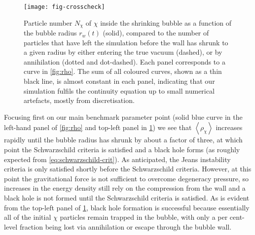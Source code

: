 \documentclass[
onecolumn, %
11pt, %
tightenlines,
superscriptaddress, %
nofootinbib, %
preprintnumbers, %
prd %
]{revtex4-1}
\newcommand{\ev}[1]{\ensuremath{\left\langle #1 %
        \right\rangle}} %
\begin{document}
\begin{figure}
    \centering
    \texttt{[image: fig-crosscheck]}
    \caption{
        Particle number $N_\chi$ of $\chi$ inside the shrinking bubble as a function of the bubble radius $r_w(t)$ (solid), compared to the number of particles that have left the simulation before the wall has shrunk to a given radius by either entering the true vacuum (dashed), or by annihilation (dotted and dot-dashed). Each panel corresponds to a curve in \cref{fig:rho}. The sum of all coloured curves, shown as a thin black line, is almost constant in each panel, indicating that our simulation fulfils the continuity equation up to small numerical artefacts, mostly from discretisation.
        \label{fig:crosscheck}
    }
\end{figure}

Focusing first on our main benchmark parameter point (solid blue curve in the left-hand panel of \cref{fig:rho} and top-left panel in \cref{fig:crosscheck}) we see that $\ev{\rho_\chi}$ increases rapidly until the bubble radius has shrunk by about a factor of three, at which point the Schwarzschild criteria is satisfied and a black hole forms (as roughly expected from \cref{eq:schwarzschild-crit}). As anticipated, the Jeans instability criteria is only satisfied shortly before the Schwarzschild criteria.  However, at this point the gravitational force is not sufficient to overcome degeneracy pressure, so increases in the energy density still rely on the compression from the wall and a black hole is not formed until the Schwarzschild criteria is satisfied.  As is evident from the top-left panel of \cref{fig:crosscheck}, black hole formation is successful because essentially all of the initial $\chi$ particles remain trapped in the bubble, with only a per cent-level fraction being lost via annihilation or escape through the bubble wall.
\end{document}
